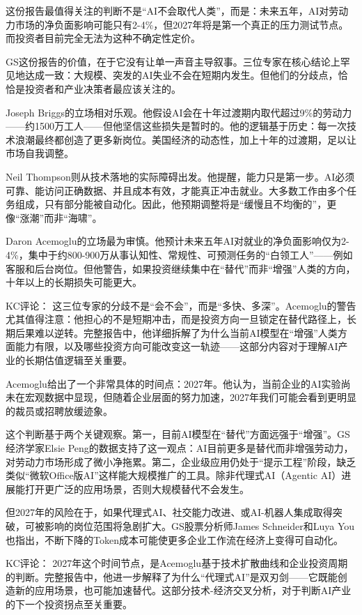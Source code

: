 \documentclass[11pt]{ctexart}
\begin{document}
这份报告最值得关注的判断不是“AI不会取代人类”，而是：未来五年，AI对劳动力市场的净负面影响可能只有2-4\%，但2027年将是第一个真正的压力测试节点。而投资者目前完全无法为这种不确定性定价。

GS这份报告的价值，在于它没有让单一声音主导叙事。三位专家在核心结论上罕见地达成一致：大规模、突发的AI失业不会在短期内发生。但他们的分歧点，恰恰是投资者和产业决策者最应该关注的。

Joseph Briggs的立场相对乐观。他假设AI会在十年过渡期内取代超过9\%的劳动力——约1500万工人——但他坚信这些损失是暂时的。他的逻辑基于历史：每一次技术浪潮最终都创造了更多新岗位。美国经济的动态性，加上十年的过渡期，足以让市场自我调整。

Neil Thompson则从技术落地的实际障碍出发。他提醒，能力只是第一步。AI必须可靠、能访问正确数据、并且成本有效，才能真正冲击就业。大多数工作由多个任务组成，只有部分能被自动化。因此，他预期调整将是“缓慢且不均衡的”，更像“涨潮”而非“海啸”。

Daron Acemoglu的立场最为审慎。他预计未来五年AI对就业的净负面影响仅为2-4\%，集中于约800-900万从事认知性、常规性、可预测任务的“白领工人”——例如客服和后台岗位。但他警告，如果投资继续集中在“替代”而非“增强”人类的方向，十年以上的长期损失可能更大。

KC评论： 这三位专家的分歧不是“会不会”，而是“多快、多深”。Acemoglu的警告尤其值得注意：他担心的不是短期冲击，而是投资方向一旦锁定在替代路径上，长期后果难以逆转。完整报告中，他详细拆解了为什么当前AI模型在“增强”人类方面能力有限，以及哪些投资方向可能改变这一轨迹——这部分内容对于理解AI产业的长期估值逻辑至关重要。

Acemoglu给出了一个非常具体的时间点：2027年。他认为，当前企业的AI实验尚未在宏观数据中显现，但随着企业层面的努力加速，2027年我们可能会看到更明显的裁员或招聘放缓迹象。

这个判断基于两个关键观察。第一，目前AI模型在“替代”方面远强于“增强”。GS经济学家Elsie Peng的数据支持了这一观点：AI目前更多是替代而非增强劳动力，对劳动力市场形成了微小净拖累。第二，企业级应用仍处于“提示工程”阶段，缺乏类似“微软Office版AI”这样能大规模推广的工具。除非代理式AI（Agentic AI）进展能打开更广泛的应用场景，否则大规模替代不会发生。

但2027年的风险在于，如果代理式AI、社交能力改进、或AI-机器人集成取得突破，可被影响的岗位范围将急剧扩大。GS股票分析师James Schneider和Luya You也指出，不断下降的Token成本可能使更多企业工作流在经济上变得可自动化。

KC评论： 2027年这个时间节点，是Acemoglu基于技术扩散曲线和企业投资周期的判断。完整报告中，他进一步解释了为什么“代理式AI”是双刃剑——它既能创造新的应用场景，也可能加速替代。这部分技术-经济交叉分析，对于判断AI产业的下一个投资拐点至关重要。
\end{document}
